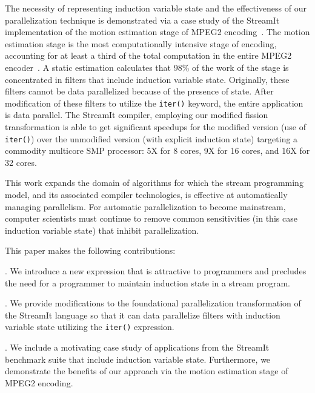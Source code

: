 The necessity of representing induction variable state and the
effectiveness of our parallelization technique is demonstrated via a
case study of the StreamIt implementation of the motion estimation
stage of MPEG2 encoding~\cite{ipdps2006}. The motion estimation stage
is the most computationally intensive stage of encoding, accounting
for at least a third of the total computation in the entire MPEG2
encoder~\cite{drake-thesis}. A static estimation calculates that 98\%
of the work of the stage is concentrated in filters that include
induction variable state. Originally, these filters cannot be data
parallelized because of the presence of state. After modification of
these filters to utilize the {\tt iter()} keyword, the entire
application is data parallel. The StreamIt compiler, employing our
modified fission transformation is able to get significant speedups
for the modified version (use of {\tt iter()}) over the unmodified
version (with explicit induction state) targeting a commodity
multicore SMP processor: 5X for 8 cores, 9X for 16 cores, and 16X for
32 cores.

This work expands the domain of algorithms for which the stream
programming model, and its associated compiler technologies, is
effective at automatically managing parallelism. For automatic
parallelization to become mainstream, computer scientists must
continue to remove common sensitivities (in this case induction
variable state) that inhibit parallelization.

This paper makes the following contributions:

\mybegin

. We introduce a new expression that is attractive to
  programmers and precludes the need for a programmer to maintain
  induction state in a stream program.

  . We
  provide modifications to the foundational parallelization
  transformation of the StreamIt language so that it can
  data parallelize filters with induction variable state utilizing the
  {\tt iter()} expression.

. We include a
motivating case study of applications from the StreamIt benchmark
suite that include induction variable state.  Furthermore, we
demonstrate the benefits of our approach via the motion estimation
stage of MPEG2 encoding.

\myend

